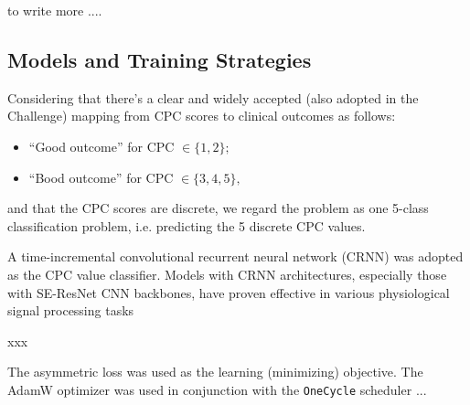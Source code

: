 to write more ....

\subsection{Models and Training Strategies}
\label{subsec:models}

Considering that there's a clear and widely accepted (also adopted in the Challenge) mapping from CPC scores to clinical outcomes as follows:
\begin{itemize}
    \item ``Good outcome'' for CPC $\in \{1, 2\};$
    \item ``Bood outcome'' for CPC $\in \{3, 4, 5\},$
\end{itemize}
and that the CPC scores are discrete, we regard the problem as one 5-class classification problem, i.e. predicting the 5 discrete CPC values.

A time-incremental convolutional recurrent neural network (CRNN) \cite{Kang_2022_cinc2021_iop} was adopted as the CPC value classifier. Models with CRNN architectures, especially those with SE-ResNet \cite{hu2020senet} CNN backbones, have proven effective in various physiological signal processing tasks \cite{Kang_2022_cinc2021_iop, wen_cinc2022}

xxx

The asymmetric loss \cite{ridnik2021asymmetric_loss} was used as the learning (minimizing) objective. The AdamW optimizer \cite{adamw_amsgrad} was used in conjunction with the \texttt{OneCycle} scheduler \cite{smith2019one_cycle}...
